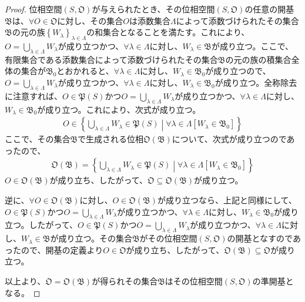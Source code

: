 \documentclass[dvipdfmx]{jsarticle}
\begin{document}
\begin{proof}
位相空間$\left( S,\mathfrak{O} \right)$が与えられたとき、その位相空間$\left( S,\mathfrak{O} \right)$の任意の開基$\mathfrak{B}$は、$\forall O \in \mathfrak{O}$に対し、その集合$O$は添数集合$\varLambda$によって添数づけられたその集合$\mathfrak{B}$の元の族$\left\{ W_{\lambda} \right\}_{\lambda \in \varLambda}$の和集合となることを満たす。これにより、$O = \bigcup_{\lambda \in \varLambda} W_{\lambda}$が成り立つかつ、$\forall\lambda \in \varLambda$に対し、$W_{\lambda}\in \mathfrak{B}$が成り立つ。ここで、有限集合である添数集合によって添数づけられたその集合$\mathfrak{B}$の元の族の積集合全体の集合が$\mathfrak{B}_{0}$とおかれると、$\forall\lambda \in \varLambda$に対し、$W_{\lambda} \in \mathfrak{B}_{0}$が成り立つので、$O = \bigcup_{\lambda \in \varLambda} W_{\lambda}$が成り立つかつ、$\forall\lambda \in \varLambda$に対し、$W_{\lambda} \in \mathfrak{B}_{0}$が成り立つ。全称除去に注意すれば、$O \in \mathfrak{P}(S)$かつ$O = \bigcup_{\lambda \in \varLambda} W_{\lambda}$が成り立つかつ、$\forall\lambda \in \varLambda$に対し、$W_{\lambda} \in \mathfrak{B}_{0}$が成り立つ。これにより、次式が成り立つ。
\begin{align*}
O \in \left\{ \bigcup_{\lambda \in \varLambda} W_{\lambda}\in \mathfrak{P}(S) \middle| \forall\lambda \in \varLambda\left[ W_{\lambda} \in \mathfrak{B}_{0} \right] \right\}
\end{align*}
ここで、その集合$\mathfrak{B}$で生成される位相$\mathfrak{O}\left( \mathfrak{B} \right)$について、次式が成り立つのであったので、
\begin{align*}
\mathfrak{O}\left( \mathfrak{B} \right) = \left\{ \bigcup_{\lambda \in \varLambda} W_{\lambda}\in \mathfrak{P}(S) \middle| \forall\lambda \in \varLambda\left[ W_{\lambda} \in \mathfrak{B}_{0} \right] \right\}
\end{align*}
$O \in \mathfrak{O}\left( \mathfrak{B} \right)$が成り立ち、したがって、$\mathfrak{O \subseteq O}\left( \mathfrak{B} \right)$が成り立つ。\par
逆に、$\forall O \in \mathfrak{O}\left( \mathfrak{B} \right)$に対し、$O \in \mathfrak{O}\left( \mathfrak{B} \right)$が成り立つなら、上記と同様にして、$O \in \mathfrak{P}(S)$かつ$O = \bigcup_{\lambda \in \varLambda} W_{\lambda}$が成り立つかつ、$\forall\lambda \in \varLambda$に対し、$W_{\lambda} \in \mathfrak{B}_{0}$が成り立つ。したがって、$O \in \mathfrak{P}(S)$かつ$O = \bigcup_{\lambda \in \varLambda} W_{\lambda}$が成り立つかつ、$\forall\lambda \in \varLambda$に対し、$W_{\lambda}\in \mathfrak{B}$が成り立つ。その集合$\mathfrak{B}$がその位相空間$\left( S,\mathfrak{O} \right)$の開基となすのであったので、開基の定義より$O \in \mathfrak{O}$が成り立ち、したがって、$\mathfrak{O}\left( \mathfrak{B} \right)\subseteq \mathfrak{O}$が成り立つ。\par
以上より、$\mathfrak{O} = \mathfrak{O}\left( \mathfrak{B} \right)$が得られその集合$\mathfrak{B}$はその位相空間$\left( S,\mathfrak{O} \right)$の準開基となる。
\end{proof}
\end{document}
